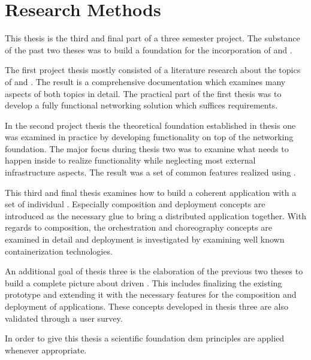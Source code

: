 \chapter{Research Methods}

This thesis is the third and final part of a three semester project. The
substance of the past two theses was to build a foundation for the incorporation
of \mss{} and \ogs{}. 

The first project thesis \cite{biedermann2015project1} mostly consisted of a
literature research about the topics of \ogs{} and \mss{}. The result is a
comprehensive documentation which examines many aspects of both topics in
detail. The practical part of the first thesis was to develop a fully functional
\ms{} networking solution which suffices \og{} requirements.

In the second project thesis \cite{biedermann2016project2} the theoretical
foundation established in thesis one was examined in practice by developing
\og{} functionality on top of the networking foundation. The major focus during
thesis two was to examine what needs to happen inside \mss{} to realize \og{}
functionality while neglecting most external infrastructure aspects. The result
was a set of common \og{} features realized using \mss{}.

This third and final thesis examines how to build a coherent application with a
set of individual \mss{}. Especially composition and deployment concepts are
introduced as the necessary glue to bring a distributed application together.
With regards to composition, the orchestration and choreography concepts are
examined in detail and deployment is investigated by examining well known
containerization technologies.

An additional goal of thesis three is the elaboration of the previous two theses
to build a complete picture about \ms{} driven \ogs{}. This includes finalizing
the existing prototype and extending it with the necessary features for the
composition and deployment of \ms{} applications. These concepts developed in
thesis three are also validated through a user survey.

In order to give this thesis a scientific foundation \gls{dsm} principles are
applied whenever appropriate.



 
















